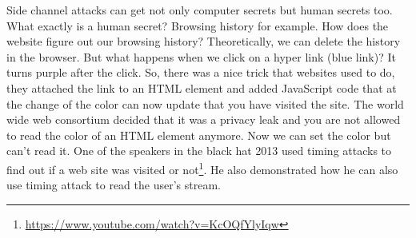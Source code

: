 Side channel attacks can get not only computer secrets but human secrets too.
What exactly is a human secret? Browsing history for example. How does the
website figure out our browsing history? Theoretically, we can delete the
history in the browser. But what happens when we click on a hyper link (blue
link)? It turns purple after the click. So, there was a nice trick that websites
used to do, they attached the link to an HTML element and added JavaScript code
that at the change of the color can now update that you have visited the site.
The world wide web consortium decided that it was a privacy leak and you are not
allowed to read the color of an HTML element anymore. Now we can set the color
but can't read it. One of the speakers in the black hat 2013 used timing attacks
to find out if a web site was visited or
not\footnote{\url{https://www.youtube.com/watch?v=KcOQfYlyIqw}}. He also
demonstrated how he can also use timing attack to read the user's stream. 